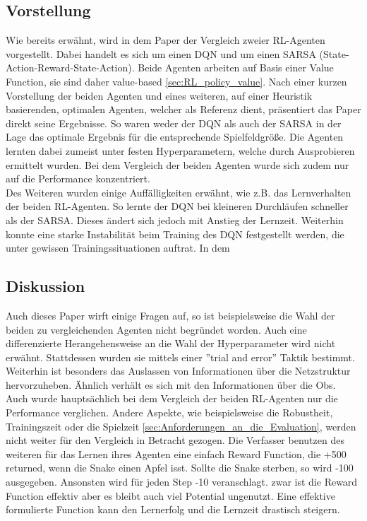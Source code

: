 \subsection{Vorstellung}
Wie bereits erwähnt, wird in dem Paper der Vergleich zweier RL-Agenten vorgestellt. Dabei handelt es sich um einen DQN und um einen SARSA (State-Action-Reward-State-Action). Beide Agenten arbeiten auf Basis einer Value Function, sie sind daher value-based \ref{sec:RL_policy_value}. Nach einer kurzen Vorstellung der beiden Agenten und eines weiteren, auf einer Heuristik basierenden, optimalen Agenten, welcher als Referenz dient, präsentiert das Paper direkt seine Ergebnisse. So waren weder der DQN als auch der SARSA in der Lage das optimale Ergebnis für die entsprechende Spielfeldgröße. Die Agenten lernten dabei zumeist unter festen Hyperparametern, welche durch Ausprobieren ermittelt wurden. Bei dem Vergleich der beiden Agenten wurde sich zudem nur auf die Performance konzentriert.\\
Des Weiteren wurden einige Auffälligkeiten erwähnt, wie z.B. das Lernverhalten der beiden RL-Agenten. So lernte der DQN bei kleineren Durchläufen schneller als der SARSA. Dieses ändert sich jedoch mit Anstieg der Lernzeit. Weiterhin konnte eine starke Instabilität beim Training des DQN festgestellt werden, die unter gewissen Trainingssituationen auftrat. In dem 

\subsection{Diskussion}
Auch dieses Paper wirft einige Fragen auf, so ist beispielsweise die Wahl der beiden zu vergleichenden Agenten nicht begründet worden. Auch eine differenzierte Herangehensweise an die Wahl der Hyperparameter wird nicht erwähnt. Stattdessen wurden sie mittels einer ''trial and error'' Taktik bestimmt. 
Weiterhin ist besonders das Auslassen von Informationen über die Netzstruktur hervorzuheben. Ähnlich verhält es sich mit den Informationen über die Obs.\\
Auch wurde hauptsächlich bei dem Vergleich der beiden RL-Agenten nur die Performance verglichen. Andere Aspekte, wie beispielsweise die Robustheit, Trainingszeit oder die Spielzeit \ref{sec:Anforderungen_an_die_Evaluation}, werden nicht weiter für den Vergleich in Betracht gezogen. Die Verfasser benutzen des weiteren für das Lernen ihres Agenten eine einfach Reward Function, die +500 returned, wenn die Snake einen Apfel isst. Sollte die Snake sterben, so wird -100 ausgegeben. Ansonsten wird für jeden Step -10 veranschlagt. zwar ist die Reward Function effektiv aber es bleibt auch viel Potential ungenutzt. Eine effektive formulierte Function kann den Lernerfolg und die Lernzeit drastisch steigern.


